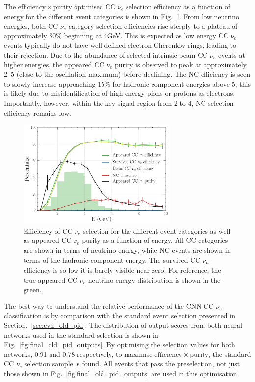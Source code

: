 The $\mathrm{efficiency}\times\mathrm{purity}$ optimised CC $\nu_{e}$ selection efficiency as a
function of energy for the different event categories is shown in Fig.~\ref{fig:final_nuel_hists}.
From low neutrino energies, both CC $\nu_{e}$ category selection efficiencies rise steeply to a
plateau of approximately 80\% beginning at \unit{4}{GeV}. This is expected as low energy CC
$\nu_{e}$ events typically do not have well-defined electron Cherenkov rings, leading to their
rejection. Due to the abundance of selected intrinsic beam CC $\nu_{e}$ events at higher energies,
the appeared CC $\nu_{e}$ purity is observed to peak at approximately \unit{2.5}{\GeV} (close to
the oscillation maximum) before declining. The NC efficiency is seen to slowly increase
approaching 15\% for hadronic component energies above \unit{5}{\GeV}; this is likely due to
misidentification of high energy pions or protons as electrons. Importantly, however, within the
key signal region from 2 to \unit{4}{\GeV}, NC selection efficiency remains low.

\begin{figure} %
    \includegraphics[width=0.7\textwidth]{diagrams/6-cvn/chipsnet/final_nuel_hists.pdf}
    \caption[Efficiency of CC $\nu_{e}$ selection as a function of energy.]
    {Efficiency of CC $\nu_{e}$ selection for the different event categories as well as appeared CC
        $\nu_{e}$ purity as a function of energy. All CC categories are shown in terms of neutrino
        energy, while NC events are shown in terms of the hadronic component energy. The survived CC
        $\nu_{\mu}$ efficiency is so low it is barely visible near zero. For reference, the true
        appeared CC $\nu_{e}$ neutrino energy distribution is shown in the green.}
    \label{fig:final_nuel_hists}
\end{figure}

The best way to understand the relative performance of the CNN CC $\nu_{e}$ classification is by
comparison with the standard event selection presented in Section.~\ref{sec:cvn_old_pid}. The
distribution of output scores from both neural networks used in the standard selection is shown in
Fig.~\ref{fig:final_old_pid_outputs}. By optimising the selection values for both networks, 0.91
and 0.78 respectively, to maximise $\mathrm{efficiency}\times\mathrm{purity}$, the standard CC
$\nu_{e}$ selection sample is found. All events that pass the preselection, not just those shown
in Fig.~\ref{fig:final_old_pid_outputs} are used in this optimisation.

